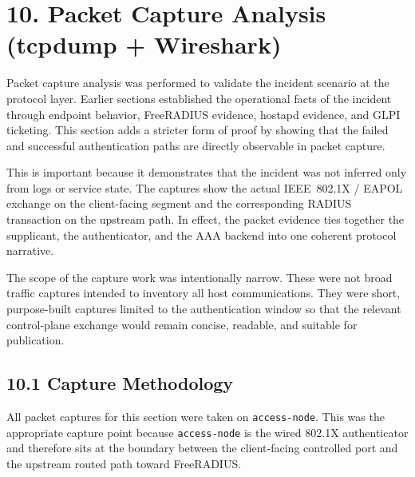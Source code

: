 \documentclass[11pt]{article}
\begin{document}
\section{10. Packet Capture Analysis (tcpdump + Wireshark)}
\label{sec:packet-capture-analysis-tcpdump-and-wireshark}

Packet capture analysis was performed to validate the incident scenario at the protocol layer. Earlier sections established the operational facts of the incident through endpoint behavior, FreeRADIUS evidence, hostapd evidence, and GLPI ticketing. This section adds a stricter form of proof by showing that the failed and successful authentication paths are directly observable in packet capture.

This is important because it demonstrates that the incident was not inferred only from logs or service state. The captures show the actual IEEE~802.1X / EAPOL exchange on the client-facing segment and the corresponding RADIUS transaction on the upstream path. In effect, the packet evidence ties together the supplicant, the authenticator, and the AAA backend into one coherent protocol narrative.

The scope of the capture work was intentionally narrow. These were not broad traffic captures intended to inventory all host communications. They were short, purpose-built captures limited to the authentication window so that the relevant control-plane exchange would remain concise, readable, and suitable for publication.


\subsection{10.1 Capture Methodology}
\label{sec:capture-methodology}

All packet captures for this section were taken on \texttt{access-node}. This was the appropriate capture point because \texttt{access-node} is the wired 802.1X authenticator and therefore sits at the boundary between the client-facing controlled port and the upstream routed path toward FreeRADIUS.
\end{document}
